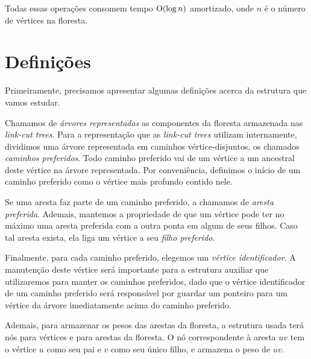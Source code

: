 Todas essas operações consomem tempo $\mathrm{O}(\log n)$ amortizado, onde $n$ é o número de vértices na floresta.

\section{Definições}
\label{sec:lct-definicoes}

Primeiramente, precisamos apresentar algumas definições acerca da estrutura que vamos estudar.

Chamamos de \emph{árvores representadas} as componentes da floresta armazenada nas \emph{link-cut trees}. Para a representação que as \emph{link-cut trees} utilizam internamente, dividimos uma árvore representada em caminhos vértice-disjuntos, os chamados \emph{caminhos preferidos}. Todo caminho preferido vai de um vértice a um ancestral deste vértice na árvore representada. Por conveniência, definimos o início de um caminho preferido como o vértice mais profundo contido nele.

Se uma aresta faz parte de um caminho preferido, a chamamos de \emph{aresta preferida}. Ademais, mantemos a propriedade de que um vértice pode ter no máximo uma aresta preferida com a outra ponta em algum de seus filhos. Caso tal aresta exista, ela liga um vértice a seu \emph{filho preferido}.

Finalmente, para cada caminho preferido, elegemos um \emph{vértice identificador}. A manutenção deste vértice será importante para a estrutura auxiliar que utilizaremos para manter os caminhos preferidos, dado que o vértice identificador de um caminho preferido será responsável por guardar um ponteiro para um vértice da árvore imediatamente acima do caminho preferido.

Ademais, para armazenar os pesos das arestas da floresta, a estrutura usada terá nós para vértices e para arestas da floresta. O nó correspondente à aresta $uv$ tem o vértice $u$ como seu pai e $v$ como seu único filho, e armazena o peso de $uv$.

